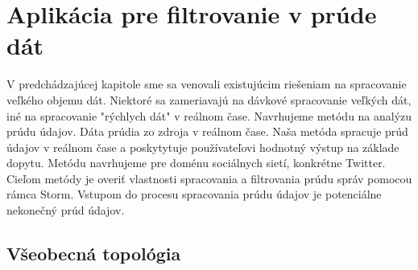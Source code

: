 \linespread{1.5}

\chapter{Aplikácia pre filtrovanie v prúde dát}
V predchádzajúcej kapitole sme sa venovali existujúcim riešeniam na spracovanie veľkého objemu dát. Niektoré sa zameriavajú na dávkové spracovanie veľkých dát, iné na spracovanie "rýchlych dát" v reálnom čase.
Navrhujeme metódu na analýzu prúdu údajov. Dáta prúdia zo zdroja v reálnom čase. Naša metóda spracuje prúd údajov v reálnom čase a poskytytuje používateľovi hodnotný výstup na základe dopytu. Metódu navrhujeme pre doménu sociálnych sietí, konkrétne Twitter. Cieľom metódy je overiť vlastnosti spracovania a filtrovania prúdu správ pomocou rámca Storm.
Vstupom do procesu spracovania prúdu údajov je potenciálne nekonečný prúd údajov.
\section{Všeobecná topológia}



%